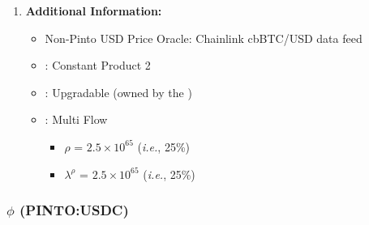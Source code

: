 \documentclass[class=article, crop=false]{standalone}
\begin{document}
\begin{enumerate}
    \item \textbf{Additional Information:}
        \begin{itemize}
            \item Non-Pinto USD Price Oracle: Chainlink cbBTC/USD data feed
            \item {}: Constant Product 2
            \item {}: Upgradable  (owned by the )
            \item {}: Multi Flow
                \begin{itemize}
                    \item $\rho$ = $2.5 \times 10^{65}$ (\textit{i.e.}, 25\%)
                    \item $\lambda^{\rho}$ = $2.5 \times 10^{65}$ (\textit{i.e.}, 25\%)
                \end{itemize}
        \end{itemize}
    
\end{enumerate}


\subsubsection{$\phi$ (PINTO:USDC)}
\end{document}
